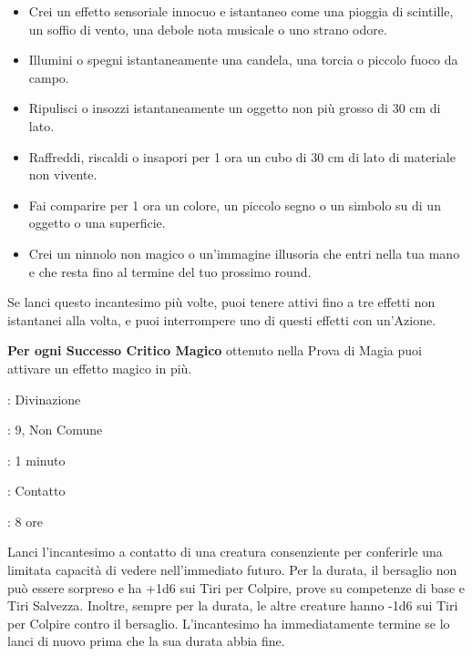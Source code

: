 \begin{multicols}{2}
\begin{itemize}[leftmargin=*] \setlength{\itemsep}{0pt}
	\item Crei un effetto sensoriale innocuo e istantaneo come una pioggia di scintille, un soffio di vento, una debole nota musicale o uno strano odore.
	\item Illumini o spegni istantaneamente una candela, una torcia o piccolo fuoco da campo.
	\item Ripulisci o insozzi istantaneamente un oggetto non più grosso di 30 cm di lato.
	\item Raffreddi, riscaldi o insapori per 1 ora un cubo di 30 cm di lato di materiale non vivente.
	\item Fai comparire per 1 ora un colore, un piccolo segno o un simbolo su di un oggetto o una superficie.
	\item Crei un ninnolo non magico o un'immagine illusoria che entri nella tua mano e che resta fino al termine del tuo prossimo round.
\end{itemize}

Se lanci questo incantesimo più volte, puoi tenere attivi fino a tre effetti non istantanei alla volta, e puoi interrompere uno di questi effetti con un'Azione.

\textbf{Per ogni Successo Critico Magico} ottenuto nella Prova di Magia puoi attivare un effetto magico in più.

\noindent\colorbox{OBSSgold!10}{
\begin{minipage}{0.95\linewidth}
\begin{description}[noitemsep, topsep=0pt, parsep=0pt, partopsep=0pt, leftmargin=0cm, labelwidth=1.3cm]
	\item[\textbf{Lista}]: Divinazione
	\item[\textbf{Livello}]: 9, Non Comune
	\item[\textbf{Lancio}]: 1 minuto
	\item[\textbf{Gittata}]: Contatto
	\item[\textbf{Durata}]: 8 ore
\end{description}
\end{minipage}}\smallskip

Lanci l'incantesimo a contatto di una creatura consenziente per conferirle una limitata capacità di vedere nell'immediato futuro. Per la durata, il bersaglio non può essere sorpreso e ha +1d6 sui Tiri per Colpire, prove su competenze di base e Tiri Salvezza. Inoltre, sempre per la durata, le altre creature hanno -1d6 sui Tiri per Colpire contro il bersaglio. L'incantesimo ha immediatamente termine se lo lanci di nuovo prima che la sua durata abbia fine.


\end{multicols}
